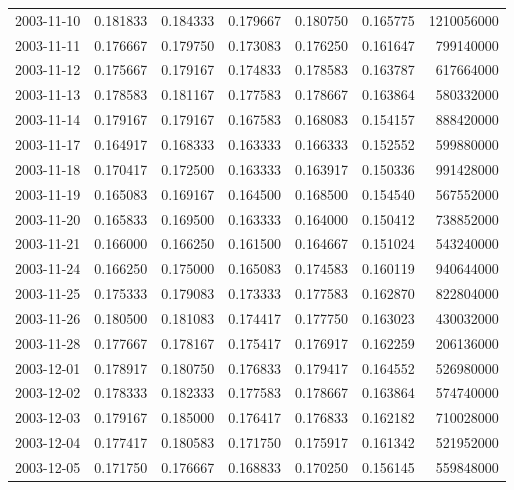 \begin{tabular}{lrrrrrr}
2003-11-10 &    0.181833 &    0.184333 &    0.179667 &    0.180750 &    0.165775 &  1210056000 \\
2003-11-11 &    0.176667 &    0.179750 &    0.173083 &    0.176250 &    0.161647 &   799140000 \\
2003-11-12 &    0.175667 &    0.179167 &    0.174833 &    0.178583 &    0.163787 &   617664000 \\
2003-11-13 &    0.178583 &    0.181167 &    0.177583 &    0.178667 &    0.163864 &   580332000 \\
2003-11-14 &    0.179167 &    0.179167 &    0.167583 &    0.168083 &    0.154157 &   888420000 \\
2003-11-17 &    0.164917 &    0.168333 &    0.163333 &    0.166333 &    0.152552 &   599880000 \\
2003-11-18 &    0.170417 &    0.172500 &    0.163333 &    0.163917 &    0.150336 &   991428000 \\
2003-11-19 &    0.165083 &    0.169167 &    0.164500 &    0.168500 &    0.154540 &   567552000 \\
2003-11-20 &    0.165833 &    0.169500 &    0.163333 &    0.164000 &    0.150412 &   738852000 \\
2003-11-21 &    0.166000 &    0.166250 &    0.161500 &    0.164667 &    0.151024 &   543240000 \\
2003-11-24 &    0.166250 &    0.175000 &    0.165083 &    0.174583 &    0.160119 &   940644000 \\
2003-11-25 &    0.175333 &    0.179083 &    0.173333 &    0.177583 &    0.162870 &   822804000 \\
2003-11-26 &    0.180500 &    0.181083 &    0.174417 &    0.177750 &    0.163023 &   430032000 \\
2003-11-28 &    0.177667 &    0.178167 &    0.175417 &    0.176917 &    0.162259 &   206136000 \\
2003-12-01 &    0.178917 &    0.180750 &    0.176833 &    0.179417 &    0.164552 &   526980000 \\
2003-12-02 &    0.178333 &    0.182333 &    0.177583 &    0.178667 &    0.163864 &   574740000 \\
2003-12-03 &    0.179167 &    0.185000 &    0.176417 &    0.176833 &    0.162182 &   710028000 \\
2003-12-04 &    0.177417 &    0.180583 &    0.171750 &    0.175917 &    0.161342 &   521952000 \\
2003-12-05 &    0.171750 &    0.176667 &    0.168833 &    0.170250 &    0.156145 &   559848000 \\

\end{tabular}
